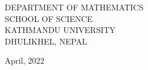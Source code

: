 \documentclass[a4paper,12pt]{report}    %
\begin{document}
{{\vspace{2cm}
{\normalsize
\begin{center}
DEPARTMENT OF MATHEMATICS\\
SCHOOL OF SCIENCE\\
KATHMANDU UNIVERSITY\\
DHULIKHEL, NEPAL\\
\end{center}
}

\begin{center}
	{\color{red} April, 2022}
\end{center}

}
}

\thispagestyle{empty}	%

%

%

\newpage



\newpage


%



\tableofcontents


\listoffigures

\listoftables

%

\newpage
{}

\newpage

\newpage

\newpage

\newpage




\printbibliography
\newpage

\end{document}

